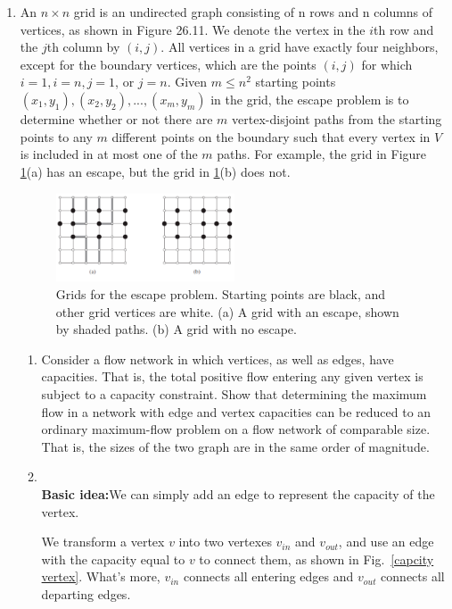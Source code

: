 \documentclass[12pt,a4paper]{article}
\makeatletter
\newtheorem*{solution}{Solution}
\theoremstyle{definition}
\renewenvironment{solution}[1][Solution] {\par\pushQED{\qed}\normalfont\topsep6\p@\@plus6\p@\relax\trivlist\item[\hskip\labelsep\bfseries#1\@addpunct{.}]\ignorespaces}{\popQED\endtrivlist\@endpefalse} \makeatother
\makeatother
\begin{document}
\begin{enumerate}
	\item An $n\times n$ grid is an undirected graph consisting of n rows and n columns of vertices, as shown in Figure 26.11. We denote the vertex in the $i$th row and the $j$th column by $(i,j)$. All vertices in a grid have exactly four neighbors, except for the boundary vertices, which are the points $(i,j)$ for which $i = 1, i = n, j = 1$, or $j = n$.
    Given $m\leqslant n^2$ starting points $(x_1,y_1), (x_2, y_2), ... , (x_m, y_m)$ in the grid, the escape problem is to determine whether or not there are $m$ vertex-disjoint paths from the starting points to any $m$ different points on the boundary such that every vertex in $V$ is included in at most one of the $m$ paths. For example, the grid in Figure \ref{Fig-EscapeProblem}(a) has an escape, but the grid in \ref{Fig-EscapeProblem}(b) does not.
    \begin{figure}[!htbp]
	\centering
	\includegraphics[width=0.5\textwidth]{Fig-EscapeProblem.pdf}
	\caption{Grids for the escape problem. Starting points are black, and other grid vertices are white. (a) A grid with an escape, shown by shaded paths. (b) A grid with no escape.}
	\label{Fig-EscapeProblem}
	\end{figure}
    \begin{enumerate}
        \item Consider a flow network in which vertices, as well as edges, have capacities. That is, the total positive flow entering any given vertex is subject to a capacity constraint. Show that determining the maximum flow in a network with edge and vertex capacities can be reduced to an ordinary maximum-flow problem on a flow network of comparable size. That is, the sizes of the two graph are in the same order of magnitude.
        \begin{solution}
        ~\\
        \textbf{Basic idea:}We can simply add an edge to represent the capacity of the vertex.
        
        We transform a vertex $v$ into two vertexes $v_{in}$ and $v_{out}$, and use an edge with the capacity equal to $v$ to connect them, as shown in Fig.~\ref{capcity vertex}. What's more, $v_{in}$ connects all entering edges and $v_{out}$ connects all departing edges.
        

\end{solution}
\end{enumerate}
\end{enumerate}
\end{document}
